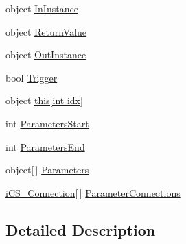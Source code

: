 \begin{DoxyCompactItemize}
\item 
object \hyperlink{classi_c_s___signature_data_source_aec99fe2e81389dd92cc9390b20e9d89f}{In\+Instance}
\item 
object \hyperlink{classi_c_s___signature_data_source_a7bfc30f7572a67fee813e2e4f779a41f}{Return\+Value}
\item 
object \hyperlink{classi_c_s___signature_data_source_a9222fef2e67c827dcb3c3d23947b2745}{Out\+Instance}
\item 
bool \hyperlink{classi_c_s___signature_data_source_aac81c2d89f3e82d102075980d0ec2cd1}{Trigger}
\item 
object \hyperlink{classi_c_s___signature_data_source_a5f9ac11fb491603b4e1947467f5d1bae}{this\mbox{[}int idx\mbox{]}}
\item 
int \hyperlink{classi_c_s___signature_data_source_a6a966657131abc59eea5c3d78625abd3}{Parameters\+Start}
\item 
int \hyperlink{classi_c_s___signature_data_source_a32168658db3c31cf7c349a078a674442}{Parameters\+End}
\item 
object\mbox{[}$\,$\mbox{]} \hyperlink{classi_c_s___signature_data_source_ae79e36a520afce3606ea995ff0c6c954}{Parameters}
\item 
\hyperlink{classi_c_s___connection}{i\+C\+S\+\_\+\+Connection}\mbox{[}$\,$\mbox{]} \hyperlink{classi_c_s___signature_data_source_ab522d17b44357170f88503918799f4a7}{Parameter\+Connections}
\end{DoxyCompactItemize}


\subsection{Detailed Description}


